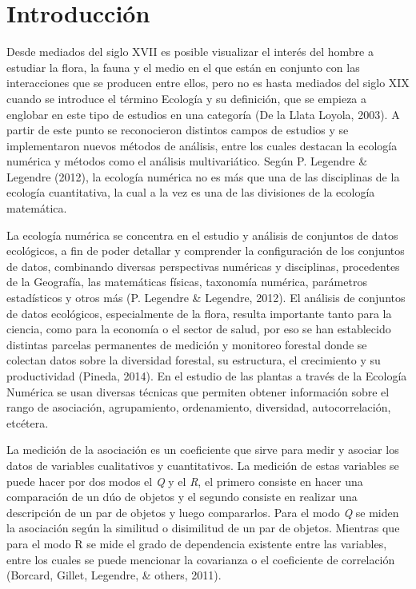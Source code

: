 \documentclass[11pt,]{article}
\begin{document}
\vskip 6.5pt


\noindent  \section{Introducción}\label{introducciuxf3n}

Desde mediados del siglo XVII es posible visualizar el interés del
hombre a estudiar la flora, la fauna y el medio en el que están en
conjunto con las interacciones que se producen entre ellos, pero no es
hasta mediados del siglo XIX cuando se introduce el término Ecología y
su definición, que se empieza a englobar en este tipo de estudios en una
categoría (De la Llata Loyola, 2003). A partir de este punto se
reconocieron distintos campos de estudios y se implementaron nuevos
métodos de análisis, entre los cuales destacan la ecología numérica y
métodos como el análisis multivariático. Según P. Legendre \& Legendre
(2012), la ecología numérica no es más que una de las disciplinas de la
ecología cuantitativa, la cual a la vez es una de las divisiones de la
ecología matemática.

La ecología numérica se concentra en el estudio y análisis de conjuntos
de datos ecológicos, a fin de poder detallar y comprender la
configuración de los conjuntos de datos, combinando diversas
perspectivas numéricas y disciplinas, procedentes de la Geografía, las
matemáticas físicas, taxonomía numérica, parámetros estadísticos y otros
más (P. Legendre \& Legendre, 2012). El análisis de conjuntos de datos
ecológicos, especialmente de la flora, resulta importante tanto para la
ciencia, como para la economía o el sector de salud, por eso se han
establecido distintas parcelas permanentes de medición y monitoreo
forestal donde se colectan datos sobre la diversidad forestal, su
estructura, el crecimiento y su productividad (Pineda, 2014). En el
estudio de las plantas a través de la Ecología Numérica se usan diversas
técnicas que permiten obtener información sobre el rango de asociación,
agrupamiento, ordenamiento, diversidad, autocorrelación, etcétera.

La medición de la asociación es un coeficiente que sirve para medir y
asociar los datos de variables cualitativos y cuantitativos. La medición
de estas variables se puede hacer por dos modos el \emph{Q} y el
\emph{R}, el primero consiste en hacer una comparación de un dúo de
objetos y el segundo consiste en realizar una descripción de un par de
objetos y luego compararlos. Para el modo \emph{Q} se miden la
asociación según la similitud o disimilitud de un par de objetos.
Mientras que para el modo R se mide el grado de dependencia existente
entre las variables, entre los cuales se puede mencionar la covarianza o
el coeficiente de correlación (Borcard, Gillet, Legendre, \& others,
2011).
\end{document}

